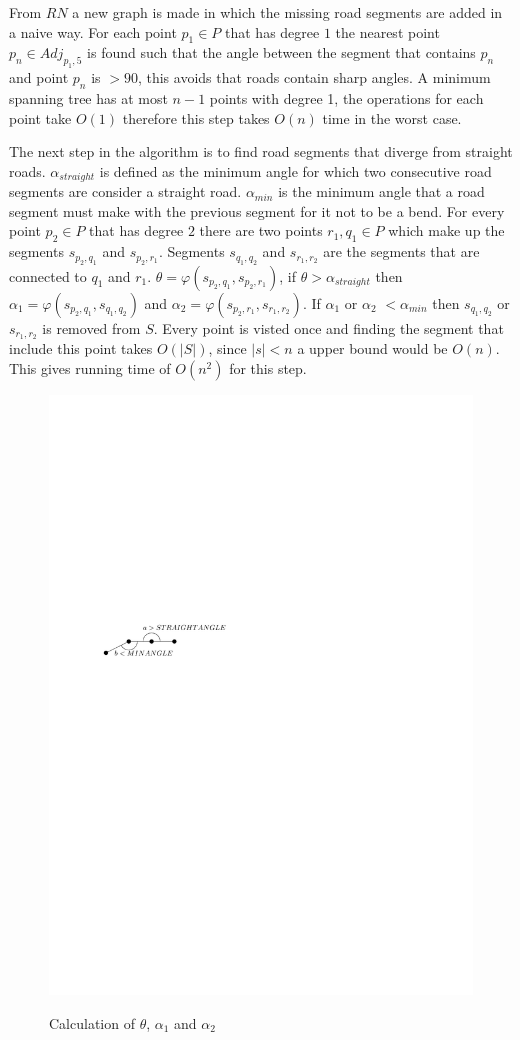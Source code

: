 \documentclass[11pt]{article}
\begin{document}
From $RN$ a new graph is made in which the missing road segments are added in a naive way. For each point $p_1 \in P$ that has degree $1$ the nearest point $p_n \in Adj_{p_1,5}$ is found such that the angle between the segment that contains $p_n$ and point $p_n$ is $>90$, this avoids that roads contain sharp angles. A minimum spanning tree has at most $n-1$ points with degree 1, the operations for each point take $O(1)$ therefore this step takes $O(n)$ time in the worst case. 

The next step in the algorithm is to find road segments that diverge from straight roads. $\alpha_{straight}$ is defined as the minimum angle for which two consecutive road segments are consider a straight road. $\alpha_{min}$ is the minimum angle that a road segment must make with the previous segment for it not to be a bend. For every point $p_2 \in P$ that has degree $2$ there are two points $r_1, q_1 \in P$ which make up the segments $s_{p_2, q_1}$ and $s_{p_2,r_1}$. Segments $s_{q_1, q_2}$ and $s_{r_1,r_2}$ are the segments that are connected to $q_1$ and $r_1$. $\theta=\varphi(s_{p_2, q_1},s_{p_2,r_1})$, if $\theta> \alpha_{straight}$ then $\alpha_1=\varphi(s_{p_2, q_1},s_{q_1, q_2})$ and $\alpha_2=\varphi(s_{p_2, r_1},s_{r_1, r_2})$. If $\alpha_1$ or $\alpha_2$ $<\alpha_{min}$ then $s_{q_1, q_2}$ or $s_{r_1, r_2}$ is removed from $S$. Every point is visted once and finding the segment that include this point takes $O(|S|)$, since $|s|<n$ a upper bound would be $O(n)$. This gives running time of $O(n^2)$ for this step.

\begin{figure}[h]
\centering
  \graphicspath{ {images/}}
  \includegraphics[width=0.5\linewidth]{NetworkRemoveSegmentsDetail}
  \label{fig:NetworkRemove}
  \caption{Calculation of $\theta$, $\alpha_1$ and $\alpha_2$}
\end{figure}
  
\end{document}

